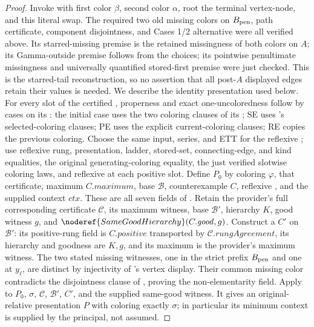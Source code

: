 \begin{proof}
Invoke  with first color
$\beta$, second color $\alpha$, root the terminal vertex-node,
and this literal swap. The required two old missing colors on
$B_{\rm pen}$, path certificate, component disjointness, and Cases 1/2
alternative were all verified above. Its starred-missing premise is
the retained missingness of both colors on $A$; its Gamma-outside
premise follows from the choices; its pointwise penultimate missingness
and universally quantified stored-first premise were just checked.
This is the starred-tail reconstruction, so no assertion that all
post-$A$ displayed edges retain their values is needed.
We describe the identity presentation used below. For every slot of
the certified , properness and exact
one-uncoloredness follow by cases on its
: the initial case uses the two coloring
clauses of its ; SE uses
's selected-coloring clauses; PE uses
the explicit current-coloring clauses; RE copies the previous coloring.
Choose the same input, series, and ETT for the reflexive
; use reflexive rung,
presentation, ladder, stored-set, connecting-edge, and kind equalities,
the original generating-coloring equality, the just verified slotwise
coloring laws, and reflexive  at each positive
slot. Define $P_0$ by coloring $\varphi$, that certificate, maximum
$C.\mathit{maximum}$, base $\mathcal B$, counterexample $C$, reflexive
, and the supplied context $\mathit{ctx}$.
These are all seven fields of
.
Retain the provider's full corresponding certificate $\mathcal C$,
its maximum witness, base $\mathcal B'$, hierarchy $K$, good witness
$g$, and $\noderef{SameGoodHierarchy}(C.\mathit{good},g)$.
Construct a  $C'$ on $\mathcal B'$:
its positive-rung field is $C.\mathit{positive}$ transported by
$\mathcal C.\mathit{rungAgreement}$, its hierarchy and goodness are
$K,g$, and its maximum is the provider's maximum witness.
The two stated missing witnesses, one in the strict prefix
$B_{\rm pen}$ and one at $y_\ell$, are distinct by injectivity of
's vertex display. Their common missing color
contradicts the disjointness clause of
, proving the non-elementarity
field. Apply  to $P_0$,
$\sigma$, $\mathcal C$, $\mathcal B'$, $C'$, and the supplied same-good
witness. It gives an original-relative presentation $P$ with coloring
exactly $\sigma$; in particular its minimum context is supplied by the
principal, not assumed.


\end{proof}
